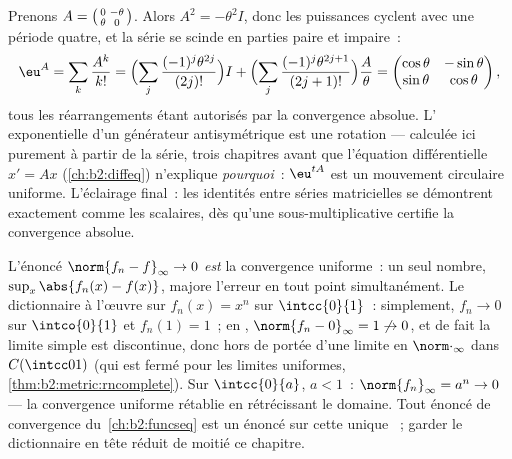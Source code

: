 \begin{example}\label{ex:b2:nvs:rotationexp}
Prenons $A = \begin{psmallmatrix}0 & -\theta\\ \theta &
0\end{psmallmatrix}$. Alors $A^2 = -\theta^2 I$, donc les puissances
cyclent avec une période quatre, et la série se scinde en parties
paire et impaire~:
\[
\eu^{A} = \sum_{k}\frac{A^k}{k!}
= \Bigl(\sum_{j}\frac{(-1)^j\theta^{2j}}{(2j)!}\Bigr) I
+ \Bigl(\sum_{j}\frac{(-1)^j\theta^{2j+1}}{(2j+1)!}\Bigr)
\frac{A}{\theta}
= \begin{pmatrix}
\cos\theta & -\sin\theta\\
\sin\theta & \cos\theta
\end{pmatrix},
\]
tous les réarrangements étant autorisés par la convergence absolue. L'
exponentielle d'un générateur antisymétrique est une rotation ---
calculée ici purement à partir de la série, trois chapitres avant que
l'équation différentielle $x' = Ax$ (\cref{ch:b2:diffeq}) n'explique
\emph{pourquoi}~: $\eu^{tA}$ est un mouvement circulaire uniforme.
L'éclairage final~: les identités entre séries matricielles se
démontrent exactement comme les scalaires, dès qu'une 
sous-multiplicative certifie la convergence absolue.
\end{example}

\begin{example}\label{ex:b2:nvs:uniformdictionary}
L'énoncé $\norm{f_n - f}_\infty \to 0$ \emph{est} la convergence
uniforme~: un seul nombre, $\sup_x\abs{f_n(x) - f(x)}$, majore
l'erreur en tout point simultanément. Le dictionnaire à l'œuvre sur
$f_n(x) = x^n$ sur $\intcc{0}{1}$~: simplement, $f_n
\to 0$ sur $\intco{0}{1}$ et $f_n(1) = 1$~; en ,
$\norm{f_n - 0}_\infty = 1 \not\to 0$, et de fait la limite simple
est discontinue, donc hors de portée d'une limite en
$\norm\cdot_\infty$ dans $C(\intcc01)$ (qui est fermé
pour les limites uniformes, \cref{thm:b2:metric:rncomplete}). Sur
$\intcc{0}{a}$, $a < 1$~: $\norm{f_n}_\infty = a^n \to 0$ ---
la convergence uniforme rétablie en rétrécissant le domaine. Tout
énoncé de convergence du~\cref{ch:b2:funcseq} est un énoncé
sur cette unique ~; garder le dictionnaire en tête réduit de
moitié ce chapitre.
\end{example}

